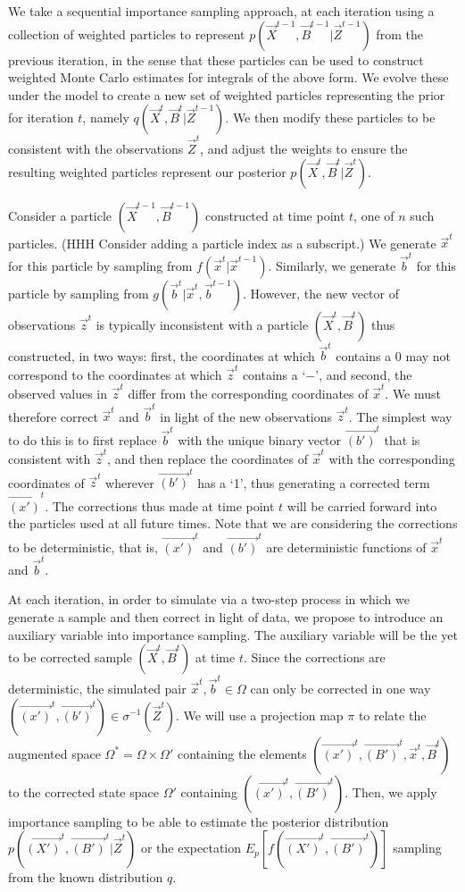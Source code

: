 We take a sequential importance sampling approach, at each iteration using a collection of weighted particles to represent $p(\vec{X}^{t-1}, \vec{B}^{t-1} | \vec{Z}^{t-1})$ from the previous iteration, in the sense that these particles can be used to construct weighted Monte Carlo estimates for integrals of the above form. We evolve these under the model to create a new set of weighted particles representing the prior for iteration $t$, namely $q(\vec{X}^{t}, \vec{B}^{t} | \vec{Z}^{t-1})$. We then modify these particles to be consistent with the observations $\vec{Z}^{t}$, and adjust the weights to ensure the resulting weighted particles represent our posterior $p(\vec{X}^{t}, \vec{B}^{t} | \vec{Z}^{t})$.

Consider a particle $(\vec{X}^{t-1},\vec{B}^{t-1})$ constructed at time point $t$, one of $n$ such particles. {\color{red} (HHH Consider adding a particle index as a subscript.)} We generate $\vec{x}^t$ for this particle by sampling from $f(\vec{x}^t | \vec{x}^{t-1})$. Similarly, we generate $\vec{b}^{t}$ for this particle by sampling from $g(\vec{b}^{t} | \vec{x}^t, \vec{b}^{t-1})$. However, the new vector of observations $\vec{z}^{t}$ is typically inconsistent with a particle $(\vec{X}^{t}, \vec{B}^{t})$ thus constructed, in two ways: first, the coordinates at which $\vec{b}^{t}$ contains a 0 may not correspond to the coordinates at which $\vec{z}^{t}$ contains a `$-$', and second, the observed values in $\vec{z}^{t}$ differ from the corresponding coordinates of $\vec{x}^{t}$. We must therefore correct $\vec{x}^{t}$ and $\vec{b}^{t}$ in light of the new observations $\vec{z}^{t}$. The simplest way to do this is to first replace $\vec{b}^{t}$ with the unique binary vector $\vec{(b')}^{t}$ that is consistent with $\vec{z}^{t}$, and then replace the coordinates of $\vec{x}^{t}$ with the corresponding coordinates of $\vec{z}^{t}$ wherever $\vec{(b')}^{t}$ has a `1', thus generating a corrected term $\vec{(x')}^{t}$. The corrections thus made at time point $t$ will be carried forward into the particles used at all future times. Note that we are considering the corrections to be deterministic, that is, $\vec{(x')}^{t}$ and $\vec{(b')}^{t}$ are deterministic functions of $\vec{x}^{t}$ and $\vec{b}^{t}$.

At each iteration, in order to simulate via a two-step process in which we generate a sample and then correct in light of data, we propose to introduce an auxiliary variable into importance sampling. The auxiliary variable will be the yet to be corrected sample $(\vec{X}^{t}, \vec{B}^{t})$ at time $t$. Since the corrections are deterministic, the simulated pair $\vec{x}^t, \vec{b}^t \in \Omega$ can only be corrected in one way $(\vec{(x')}^t, \vec{(b')}^t) \in \sigma^{-1}(\vec{Z}^t)$. We will use a projection map $\pi$ to relate the augmented space $\Omega^{*} = \Omega \times \Omega'$ containing the elements $(\vec{(x')}^{t}, \vec{(B')}^{t}, \vec{x}^{t}, \vec{B}^{t})$ to the corrected state space $\Omega'$ containing $(\vec{(x')}^{t}, \vec{(B')}^{t})$. Then, we apply importance sampling to be able to estimate the posterior distribution $p(\vec{(X')}^{t}, \vec{(B')}^{t} | \vec{Z}^{t})$ or the expectation $E_{p}[f(\vec{(X')}^{t},\vec{(B')}^{t})]$ sampling from the known distribution $q$.

